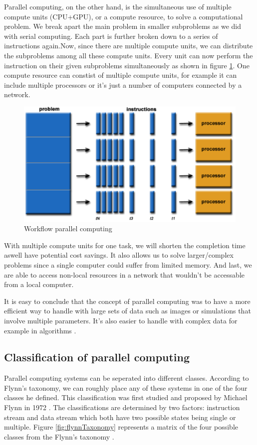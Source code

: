 \documentclass[a4paper, 11pt]{report}
\begin{document}
Parallel computing, on the other hand, is the simultaneous use of multiple compute units (CPU+GPU), or a compute resource, to solve a computational problem. We break apart the main problem in smaller subproblems as we did with serial computing. Each part is further broken down to a series of instructions again.Now, since there are multiple compute units, we can distribute the subproblems among all these compute units. Every unit can now perform the instruction on their given subproblems simultaneously as shown in figure \ref{fig:ParallelC}. One compute resource can constist of multiple compute units, for example it can include multiple processors or it's just a number of computers connected by a network.
	\begin{figure}[h]
		\centering
		\includegraphics[scale=.4]{images/parallelProblem.pdf}
		\caption{Workflow parallel computing}
		\label{fig:ParallelC}
	\end{figure}
With multiple compute units for one task, we will shorten the completion time aswell have potential cost savings. It also allows us to solve larger/complex problems since a single computer could suffer from limited memory. And last, we are able to access non-local resources in a network that wouldn't be accessable from a local computer.

It is easy to conclude that the concept of parallel computing was to have a more efficient way to handle with large sets of data such as images or simulations that involve multiple parameters. It's also easier to handle with complex data for example in algorithms \cite{barney2012parallel}.

	\subsection{Classification of parallel computing}
Parallel computing systems can be seperated into different classes. According to Flynn's taxonomy, we can roughly place any of these systems in one of the four classes he defined. This classification was first studied and proposed by Michael Flynn in 1972 \cite{Unit2COPC}. The classifications are determined by two factors: instruction stream and data stream which both have two possible states being single or multiple. Figure \ref{fig:flynnTaxonomy} represents a matrix of the four possible classes from the Flynn's taxonomy \cite{barney2012parallel}.
\end{document}
